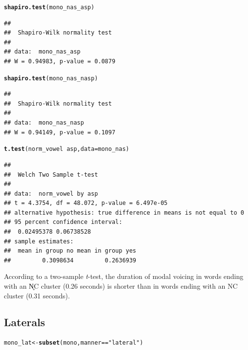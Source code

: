 \documentclass[a4paper,11pt]{article}\usepackage[]{graphicx}\usepackage[]{color}
\makeatletter
\newcommand{\hlstr}[1]{\textcolor[rgb]{0.192,0.494,0.8}{#1}}%
\newcommand{\hlopt}[1]{\textcolor[rgb]{0,0,0}{#1}}%
\newcommand{\hlstd}[1]{\textcolor[rgb]{0.345,0.345,0.345}{#1}}%
\newcommand{\hlkwb}[1]{\textcolor[rgb]{0.69,0.353,0.396}{#1}}%
\newcommand{\hlkwc}[1]{\textcolor[rgb]{0.333,0.667,0.333}{#1}}%
\newcommand{\hlkwd}[1]{\textcolor[rgb]{0.737,0.353,0.396}{\textbf{#1}}}%
\newenvironment{kframe}{%
 \def\at@end@of@kframe{}%
 \ifinner\ifhmode%
  \def\at@end@of@kframe{\end{minipage}}%
  \begin{minipage}{\columnwidth}%
 \fi\fi%
 \def\FrameCommand##1{\hskip\@totalleftmargin \hskip-\fboxsep
 \colorbox{shadecolor}{##1}\hskip-\fboxsep
     \hskip-\linewidth \hskip-\@totalleftmargin \hskip\columnwidth}%
 \MakeFramed {\advance\hsize-\width
   \@totalleftmargin\z@ \linewidth\hsize
   \@setminipage}}%
 {\par\unskip\endMakeFramed%
 \at@end@of@kframe}
\newenvironment{knitrout}{}{} %
\makeatother
\begin{document}
\begin{knitrout}
\color{fgcolor}\begin{kframe}
\begin{alltt}
\hlkwd{shapiro.test}\hlstd{(mono_nas_asp)}
\end{alltt}
\begin{verbatim}
## 
## 	Shapiro-Wilk normality test
## 
## data:  mono_nas_asp
## W = 0.94983, p-value = 0.0879
\end{verbatim}
\begin{alltt}
\hlkwd{shapiro.test}\hlstd{(mono_nas_nasp)}
\end{alltt}
\begin{verbatim}
## 
## 	Shapiro-Wilk normality test
## 
## data:  mono_nas_nasp
## W = 0.94149, p-value = 0.1097
\end{verbatim}
\begin{alltt}
\hlkwd{t.test}\hlstd{(norm_vowel} \hlopt{~} \hlstd{asp,} \hlkwc{data} \hlstd{= mono_nas)}
\end{alltt}
\begin{verbatim}
## 
## 	Welch Two Sample t-test
## 
## data:  norm_vowel by asp
## t = 4.3754, df = 48.072, p-value = 6.497e-05
## alternative hypothesis: true difference in means is not equal to 0
## 95 percent confidence interval:
##  0.02495378 0.06738528
## sample estimates:
##  mean in group no mean in group yes 
##         0.3098634         0.2636939
\end{verbatim}
\end{kframe}
\end{knitrout}

According to a two-sample \textit{t}-test, the duration of modal voicing in words ending with an N̥C cluster (0.26 seconds) is shorter than in words ending with an NC cluster (0.31 seconds).

\subsection{Laterals}

\begin{knitrout}
\color{fgcolor}\begin{kframe}
\begin{alltt}
\hlstd{mono_lat} \hlkwb{<-} \hlkwd{subset}\hlstd{(mono, manner} \hlopt{==} \hlstr{"lateral"}\hlstd{)}
\end{alltt}
\end{kframe}
\end{knitrout}
\end{document}
